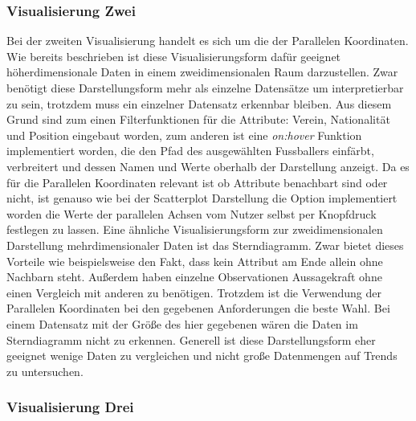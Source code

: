\documentclass[usegeometry=true]{scrartcl}
\begin{document}
\subsubsection{Visualisierung Zwei}
Bei der zweiten Visualisierung handelt es sich um die der Parallelen Koordinaten. 
Wie bereits beschrieben ist diese Visualisierungsform dafür geeignet höherdimensionale Daten in einem zweidimensionalen Raum darzustellen. Zwar benötigt diese Darstellungsform mehr als einzelne Datensätze um interpretierbar zu sein, trotzdem muss ein einzelner Datensatz erkennbar bleiben. Aus diesem Grund sind zum einen Filterfunktionen für die Attribute: Verein, Nationalität und Position eingebaut worden, zum anderen ist eine \textit{on:hover} Funktion implementiert worden, die den Pfad des ausgewählten Fussballers einfärbt, verbreitert und dessen Namen und Werte oberhalb der Darstellung anzeigt.
Da es für die Parallelen Koordinaten relevant ist ob Attribute benachbart sind oder nicht, ist genauso wie bei der Scatterplot Darstellung die Option implementiert worden die Werte der parallelen Achsen vom Nutzer selbst per Knopfdruck festlegen zu lassen.
Eine ähnliche Visualisierungsform zur zweidimensionalen Darstellung mehrdimensionaler Daten ist das Sterndiagramm. Zwar bietet dieses Vorteile wie beispielsweise den Fakt, dass kein Attribut am Ende allein ohne Nachbarn steht. Außerdem haben einzelne Observationen Aussagekraft ohne einen Vergleich mit anderen zu benötigen. Trotzdem ist die Verwendung der Parallelen Koordinaten bei den gegebenen Anforderungen die beste Wahl. Bei einem Datensatz mit der Größe des hier gegebenen wären die Daten im Sterndiagramm nicht zu erkennen. Generell ist diese Darstellungsform eher geeignet wenige Daten zu vergleichen und nicht große Datenmengen auf Trends zu untersuchen. 


\subsubsection{Visualisierung Drei}
\end{document}
